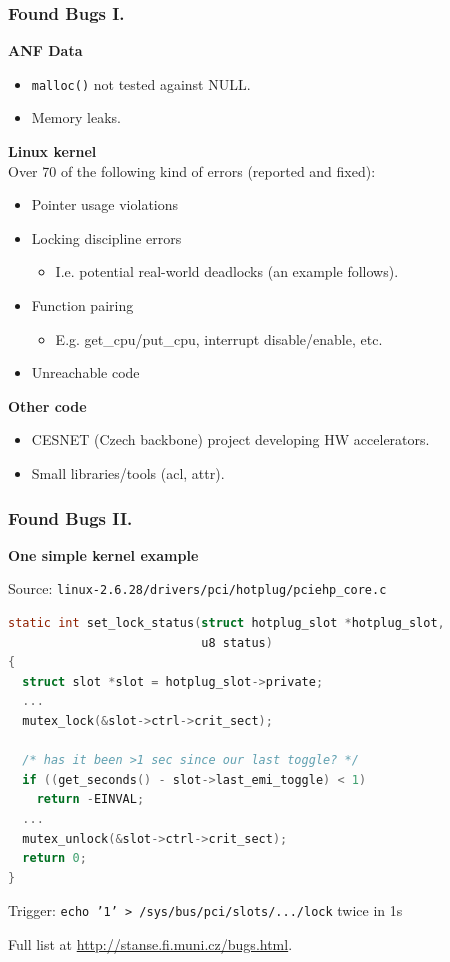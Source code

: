 \documentclass[handout,xcolor=dvipsnames]{beamer}
\newcommand{\heading}[1]{\textbf{\textcolor{BurntOrange}{#1}}}
\begin{document}
\begin{frame}
  \frametitle{Found Bugs I.}
  
  \heading{ANF Data}
  \begin{itemize}
  \item \texttt{malloc()} not tested against NULL.
  \item Memory leaks.
  \end{itemize}

  \pause
  \medskip

  \heading{Linux kernel}\\
  Over 70 of the following kind of errors (reported and fixed):
  \begin{itemize}
  \item Pointer usage violations
  \item Locking discipline errors
    \begin{itemize}
    \item I.e. potential real-world deadlocks (an example follows).
    \end{itemize}
  \item Function pairing
    \begin{itemize}
    \item E.g. get\_cpu/put\_cpu, interrupt disable/enable, etc.
    \end{itemize}
  \item Unreachable code
  \end{itemize}

  \pause
  \medskip

  \heading{Other code}
  \begin{itemize}
  \item CESNET (Czech backbone) project developing HW accelerators.
  \item Small libraries/tools (acl, attr).
  \end{itemize}
\end{frame}

\begin{frame}[fragile]
  \frametitle{Found Bugs II.}

  \heading{One simple kernel example}

  Source: \texttt{\small linux-2.6.28/drivers/pci/hotplug/pciehp\_core.c}
  \begin{lstlisting}[language=C]
static int set_lock_status(struct hotplug_slot *hotplug_slot,
                           u8 status)
{
  struct slot *slot = hotplug_slot->private;
  ...
  mutex_lock(&slot->ctrl->crit_sect);

  /* has it been >1 sec since our last toggle? */
  if ((get_seconds() - slot->last_emi_toggle) < 1)
    return -EINVAL;
  ...
  mutex_unlock(&slot->ctrl->crit_sect);
  return 0;
}
  \end{lstlisting}

  Trigger: \texttt{\small echo '1' > /sys/bus/pci/slots/.../lock} twice in 1s

  \pause
  \medskip
  Full list at \url{http://stanse.fi.muni.cz/bugs.html}.

\end{frame}
\end{document}
